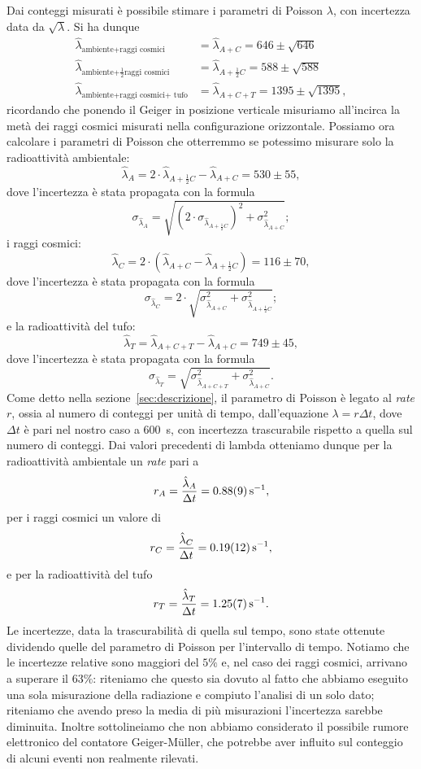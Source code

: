 \documentclass[10pt,oneside,a4paper]{article}
\begin{document}
Dai conteggi misurati è possibile stimare i parametri di Poisson $\lambda$, con incertezza data da $\sqrt{\lambda}$. Si ha dunque
\begin{align*}
\hat{\lambda}_{\text{ambiente+raggi cosmici}} &= \hat{\lambda}_{A+C} = 646 \pm \sqrt{646} \\
\hat{\lambda}_{\text{ambiente+$\frac{1}{2}$raggi cosmici}} &= \hat{\lambda}_{A+\frac{1}{2}C} = 588 \pm \sqrt{588} \\
\hat{\lambda}_{\text{ambiente+raggi cosmici+ tufo}} &= \hat{\lambda}_{A+C+T} = 1395 \pm \sqrt{1395}, 
\end{align*}
ricordando che ponendo il Geiger in posizione verticale misuriamo all'incirca la metà dei raggi cosmici misurati nella configurazione orizzontale. Possiamo ora calcolare i parametri di Poisson che otterremmo se potessimo misurare solo la radioattività ambientale: 
\[
\hat{\lambda}_A = 2\cdot\hat{\lambda}_{A+\frac{1}{2}C}-\hat{\lambda}_{A+C} = 530 \pm 55,
\]
dove l'incertezza è stata propagata con la formula
\[
\sigma_{\hat{\lambda}_A} = \sqrt{\left(2\cdot\sigma_{\hat{\lambda}_{A+\frac{1}{2}C}}\right)^2+\sigma_{\hat{\lambda}_{A+C}}^2};
\]
i raggi cosmici:
\[
\hat{\lambda}_C = 2\cdot (\hat{\lambda}_{A+C} - \hat{\lambda}_{A+\frac{1}{2}C}) = 116 \pm 70,
\]
dove l'incertezza è stata propagata con la formula
\[
\sigma_{\hat{\lambda}_C} = 2\cdot\sqrt{\sigma_{\hat{\lambda}_{A+C}}^2+\sigma_{\hat{\lambda}_{A+\frac{1}{2}C}}^2};
\]
e la radioattività del tufo:
\[
\hat{\lambda}_T = \hat{\lambda}_{A+C+T} - \hat{\lambda}_{A+C} = 749 \pm 45,
\]
dove l'incertezza è stata propagata con la formula
\[
\sigma_{\hat{\lambda}_{T}} = \sqrt{\sigma_{\hat{\lambda}_{A+C+T}}^2+\sigma_{\hat{\lambda}_{A+C}}^2}.
\]
Come detto nella sezione~\ref{sec:descrizione}, il parametro di Poisson è legato al \emph{rate} $r$, ossia al numero di conteggi per unità di tempo, dall'equazione $\lambda = r\Delta t$, dove $\Delta t$ è pari nel nostro caso a \SI{600}{s}, con incertezza trascurabile rispetto a quella sul numero di conteggi. Dai valori precedenti di lambda otteniamo dunque per la radioattività ambientale un \emph{rate} pari a
\[
r_A = \frac{\hat{\lambda}_A}{\Delta t} = \SI{0.88 \pm 0.09}{s^{-1}},
\] 
per i raggi cosmici un valore di
\[
r_C = \frac{\hat{\lambda}_C}{\Delta t} = \SI{0.19 \pm 0.12}{s^{-1}},
\]
e per la radioattività del tufo
\[
r_T = \frac{\hat{\lambda}_T}{\Delta t} = \SI{1.25 \pm 0.07}{s^{-1}}.
\]
Le incertezze, data la trascurabilità di quella sul tempo, sono state ottenute dividendo quelle del parametro di Poisson per l'intervallo di tempo.
Notiamo che le incertezze relative sono maggiori del $5\%$ e, nel caso dei raggi cosmici, arrivano a superare il $63\%$: riteniamo che questo sia dovuto al fatto che abbiamo eseguito una sola misurazione della radiazione e compiuto l'analisi di un solo dato; riteniamo che avendo preso la media di più misurazioni l'incertezza sarebbe diminuita. Inoltre sottolineiamo che non abbiamo considerato il possibile rumore elettronico del contatore Geiger-Müller, che potrebbe aver influito sul conteggio di alcuni eventi non realmente rilevati.
\end{document}
